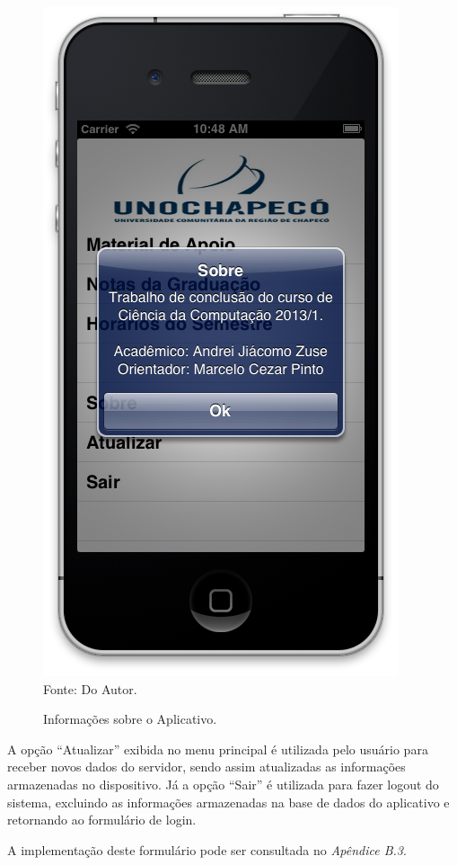 \begin{figure}[!htb]
     \centering
     \caption[Formulário Principal - Sobre]{Informações sobre o Aplicativo.}
     \includegraphics[scale=0.34]{imagens/formsobre.png}
     \\  Fonte: Do Autor.
\end{figure}
\newpage

A opção ``Atualizar'' exibida no menu principal é utilizada pelo usuário para receber novos dados do servidor, sendo assim atualizadas as informações armazenadas no dispositivo. Já a opção ``Sair'' é utilizada para fazer logout do sistema, excluindo as informações armazenadas na base de dados do aplicativo e retornando ao formulário de login.

A implementação deste formulário pode ser consultada no \emph{Apêndice B.3}.


